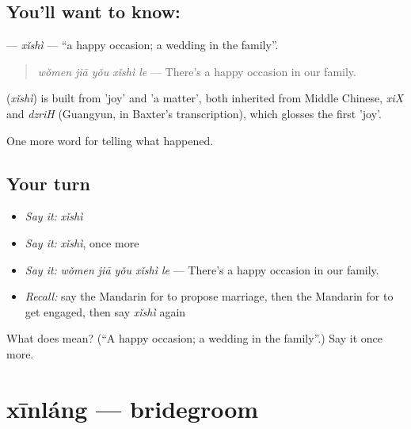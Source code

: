 \subsection*{You'll want to know: }
\textbf{} — \emph{xǐshì} — \textquotedblleft{}a happy occasion; a wedding in the family\textquotedblright{}.

\begin{quote}
\textbf{} \emph{wǒmen jiā yǒu xǐshì le} — There's a happy occasion in our family.
\end{quote}

\begin{cousinweb}
\textbf{} (\emph{xǐshì}) is built from  'joy' and  'a matter', both inherited from Middle Chinese, \emph{xiX} and \emph{dzriH} (Guangyun, in Baxter's transcription), which glosses the first 'joy'.
\end{cousinweb}

\begin{grammarlens}[title={What you've built}]
One more word for telling what happened.
\end{grammarlens}

\subsection*{Your turn}
\begin{itemize}
\raggedright
  \item \emph{Say it:} \emph{xǐshì}
  \item \emph{Say it:} \emph{xǐshì}, once more
  \item \emph{Say it:} \emph{wǒmen jiā yǒu xǐshì le} — There's a happy occasion in our family.
  \item \emph{Recall:} say the Mandarin for to propose marriage, then the Mandarin for to get engaged, then say \emph{xǐshì} again
\end{itemize}

\begin{tcolorbox}[breakable,colback=teal!4,colframe=teal!35!black,title={Before you move on}]
What does  mean? (\textquotedblleft{}A happy occasion; a wedding in the family\textquotedblright{}.) Say it once more.
\end{tcolorbox}
\section[xīnláng]{xīnláng — bridegroom}

\label{lesson:ZH-C305-xinlang}



